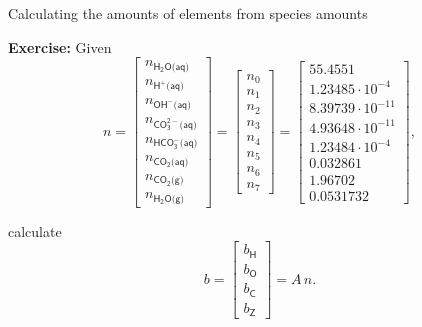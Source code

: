 %
\begin{frame}{Calculating the amounts of elements from species amounts}

\vskip 10pt
\lcol[0.7]

\alert{\textbf{Exercise:}} Given 
\[
n=\left[\begin{array}{l}
n_{\mathsf{H_{2}O\text{(}aq\text{)}}}\\
n_{\mathsf{H^{+}\text{(}aq\text{)}}}\\
n_{\mathsf{OH^{-}\text{(}aq\text{)}}}\\
n_{\mathsf{CO_{3}^{2-}\text{(}aq\text{)}}}\\
n_{\mathsf{HCO_{3}^{-}\text{(}aq\text{)}}}\\
n_{\mathsf{CO_{2}\text{(}aq\text{)}}}\\
n_{\mathsf{CO_{2}\text{(}g\text{)}}}\\
n_{\mathsf{H_{2}O\text{(}g\text{)}}}
\end{array}\right]=\begin{bmatrix}n_{0}\\
n_{1}\\
n_{2}\\
n_{3}\\
n_{4}\\
n_{5}\\
n_{6}\\
n_{7}
\end{bmatrix}=\begin{bmatrix}55.4551\\
1.23485\cdot10^{-4}\\
8.39739\cdot10^{-11}\\
4.93648\cdot10^{-11}\\
1.23484\cdot10^{-4}\\
0.032861\\
1.96702\\
0.0531732
\end{bmatrix},
\]

\rcol[0.3]
calculate
\[
b=\left[\begin{array}{l}
b_{\mathsf{H}}\\
b_{\mathsf{O}}\\
b_{\mathsf{C}}\\
b_{\mathsf{Z}}
\end{array}\right] = A \, n.
\]
\ecol
\vskip 10pt
\end{frame}
